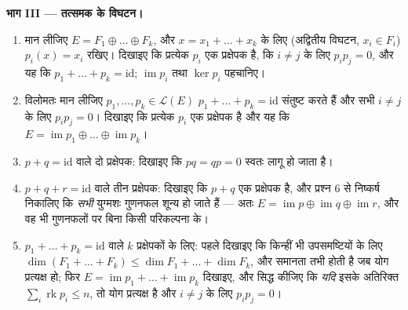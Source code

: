 \begin{problem}
\medskip \noindent\textbf{भाग III --- तत्समक के विघटन।}
\begin{enumerate}[resume]
  \item मान लीजिए $E = F_1 \oplus \dots \oplus F_k$, और $x = x_1 + \dots +
  x_k$ के लिए (अद्वितीय विघटन, $x_i \in F_i$) $p_i(x) = x_i$ रखिए। दिखाइए कि
  प्रत्येक $p_i$ एक प्रक्षेपक है, कि $i \neq j$ के लिए $p_i p_j = 0$, और यह
  कि $p_1 + \dots + p_k = \mathrm{id}$; $\operatorname{im} p_i$ तथा $\ker
  p_i$ पहचानिए।
  \item विलोमतः मान लीजिए $p_1, \dots, p_k \in \mathcal{L}(E)$ $p_1 + \dots
  + p_k = \mathrm{id}$ संतुष्ट करते हैं और सभी $i \neq j$ के लिए $p_i p_j =
  0$। दिखाइए कि प्रत्येक $p_i$ एक प्रक्षेपक है और यह कि $E =
  \operatorname{im} p_1 \oplus \dots \oplus \operatorname{im} p_k$।
  \item $p + q = \mathrm{id}$ वाले दो प्रक्षेपक: दिखाइए कि $pq = qp = 0$
  स्वतः लागू हो जाता है।
  \item $p + q + r = \mathrm{id}$ वाले तीन प्रक्षेपक: दिखाइए कि $p + q$ एक
  प्रक्षेपक है, और प्रश्न 6 से निष्कर्ष निकालिए कि \emph{सभी} युग्मशः गुणनफल
  शून्य हो जाते हैं --- अतः $E = \operatorname{im} p \oplus
  \operatorname{im} q \oplus \operatorname{im} r$, और वह भी गुणनफलों पर बिना
  किसी परिकल्पना के।
  \item $p_1 + \dots + p_k = \mathrm{id}$ वाले $k$ प्रक्षेपकों के लिए: पहले
  दिखाइए कि किन्हीं भी उपसमष्टियों के लिए $\dim (F_1 + \dots + F_k) \leq
  \dim F_1 + \dots + \dim F_k$, और समानता तभी होती है जब योग प्रत्यक्ष हो;
  फिर $E = \operatorname{im} p_1 + \dots + \operatorname{im} p_k$ दिखाइए, और
  सिद्ध कीजिए कि \emph{यदि} इसके अतिरिक्त $\sum_i \operatorname{rk} p_i \leq
  n$, तो योग प्रत्यक्ष है और $i \neq j$ के लिए $p_i p_j = 0$।
\end{enumerate}


\end{problem}
